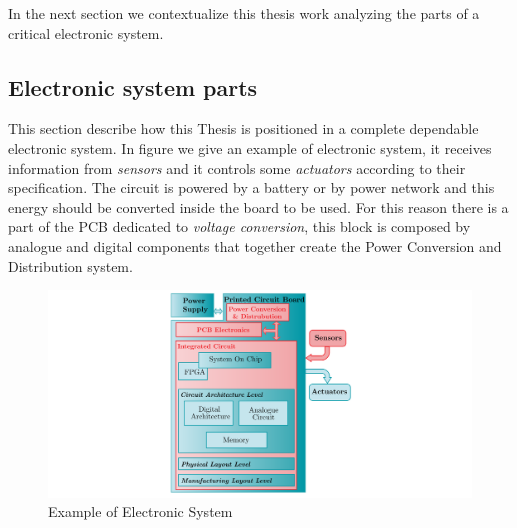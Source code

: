 {{{			In the next section we contextualize this thesis work analyzing the parts of a critical electronic system.
		} %
	
		\newpage
		\subsection{Electronic system parts}{
			This section describe how this Thesis is positioned in a complete dependable electronic system.
			In figure  we give an example of electronic system, it receives information from \textit{sensors} and it controls some \textit{actuators} according to their specification. The circuit is powered by a battery or by power network and this energy should be converted inside the board to be used. For this reason there is a part of the PCB dedicated to \textit{voltage conversion}, this block is composed by analogue and digital components that together create the Power Conversion and Distribution system.
			
			\begin{figure}[H]
				\centering
				\includegraphics[scale=0.26,center]{./images/ElectronicSystemParts.png}
				\caption{Example of Electronic System}
				\label{fig:ElectronicSystemParts}
			\end{figure} 
			
}}}

